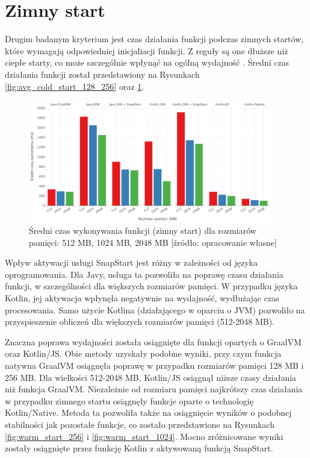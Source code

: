 \newpage
\section{Zimny start}\label{chapter:results_cold_start}

Drugim badanym kryterium jest czas działania funkcji podczas zimnych startów, które wymagają odpowiedniej inicjaliacji funkcji.
Z reguły są one dłuższe niż ciepłe starty, co może szczególnie wpłynąć na ogólną wydajność \cite{9284261}\cite{8605777}.
Średni czas działania funkcji został przedstawiony na Rysunkach \ref{fig:avg_cold_start_128_256} oraz \ref{fig:avg_cold_start_512_2045}.

\begin{figure}[!h]
    \centering
    \includegraphics[width=0.95\textwidth]{charts/results/avg-cold-start-512-2048.png}
    \caption{Średni czas wykonywania funkcji (zimny start) dla rozmiarów pamięci: 512 MB, 1024 MB, 2048 MB  [źródło: opracowanie własne]}
    \label{fig:avg_cold_start_512_2045}
\end{figure}

Wpływ aktywacji usługi SnapStart jest różny w zależności od języka oprogramowania.
Dla Javy, usługa ta pozwoliła na poprawę czasu działania funkcji, w szczególności dla większych rozmiarów pamięci.
W przypadku języka Kotlin, jej aktywacja wpłynęła negatywnie na wydajność, wydłużając czas procesowania.
Samo użycie Kotlina (działającego w oparciu o JVM) pozwoliło na przyspieszenie obliczeń dla większych rozmiarów pamięci (512-2048 MB).

Znaczna poprawa wydajności została osiągnięte dla funkcji opartych o GraalVM oraz Kotlin/JS.
Obie metody uzyskały podobne wyniki, przy czym funkcja natywna GraalVM osiągnęła poprawę w przypadku rozmiarów pamięci 128 MB i 256 MB.
Dla wielkości 512-2048 MB, Kotlin/JS osiągnął niższe czasy działania niż funkcja GraalVM.
Niezależnie od rozmiaru pamięci najkrótszy czas działania w przypadku zimnego startu osiągnęły funkcje oparte o technologię Kotlin/Native.
Metoda ta pozwoliła także na osiągnięcie wyników o podobnej stabilności jak pozostałe funkcje, co zostało przedstawione na Rysunkach \ref{fig:warm_start_256} i \ref{fig:warm_start_1024}.
Mocno zróżnicowane wyniki zostały osiągnięte przez funkcję Kotlin z aktywowaną funkcją SnapStart.

